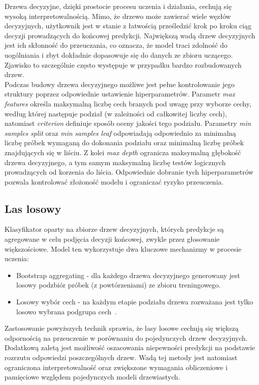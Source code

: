 \documentclass[a4paper,twoside,12pt]{book}
\begin{document}
Drzewa decyzyjne, dzięki prostocie procesu uczenia i działania, cechują się wysoką interpretowalnością. Mimo, że drzewo może zawierać wiele węzłów decyzyjnych, użytkownik jest w stanie z łatwością prześledzić krok po kroku ciąg decyzji prowadzących do końcowej predykcji.
Największą wadą drzew decyzyjnych jest ich skłonność do przeuczania, co oznacza, że model traci zdolność do uogólniania i zbyt dokładnie dopasowuje się do danych ze zbioru uczącego. Zjawisko to szczególnie często występuje w przypadku bardzo rozbudowanych drzew.\\

Podczas budowy drzewa decyzyjnego możliwe jest pełne kontrolowanie jego struktury poprzez odpowiednie ustawienie hiperparametrów. Parametr \textit{max features} określa maksymalną liczbę cech branych pod uwagę przy wyborze cechy, według której następuje podział (w zależności od całkowitej liczby cech), natomiast \textit{criterion} definiuje sposób oceny jakości tego podziału. Parametry \textit{min samples split} oraz \textit{min samples leaf} odpowiadają odpowiednio za minimalną liczbę próbek wymaganą do dokonania podziału oraz minimalną liczbę próbek znajdujących się w liściu. Z kolei \textit{max depth} ogranicza maksymalną głębokość drzewa decyzyjnego, a tym samym maksymalną liczbę testów logicznych prowadzących od korzenia do liścia. Odpowiednie dobranie tych hiperparametrów pozwala kontrolować złożoność modelu i ograniczać ryzyko przeuczenia.

\subsection*{Las losowy}
Klasyfikator oparty na zbiorze drzew decyzyjnych, których predykcje są agregowane w celu podjęcia decyzji końcowej, zwykle przez głosowanie większościowe. Model ten wykorzystuje dwa kluczowe mechanizmy w procesie uczenia:

\begin{itemize}
	\item Bootstrap aggregating - dla każdego drzewa decyzyjnego generowany jest losowy podzbiór próbek (z powtórzeniami) ze zbioru treningowego.
	\item Losowy wybór cech - na każdym etapie podziału drzewa rozważana jest tylko losowo wybrana podgrupa cech~\cite{Majumdar2023}.
\end{itemize}

Zastosowanie powyższych technik sprawia, że lasy losowe cechują się większą odpornością na przeuczenie w porównaniu do pojedynczych drzew decyzyjnych. Dodatkową zaletą jest możliwość oszacowania niepewności predykcji na podstawie rozrzutu odpowiedzi poszczególnych drzew. Wadą tej metody jest natomiast ograniczona interpretowalność oraz zwiększone wymagania obliczeniowe i pamięciowe względem pojedynczych modeli drzewiastych.\\
\end{document}
